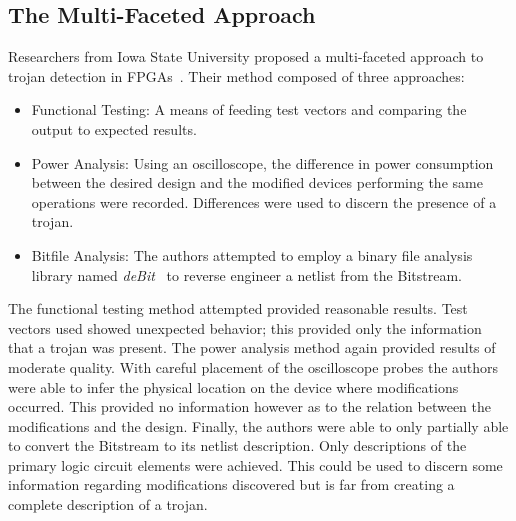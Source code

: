 \subsection{The Multi-Faceted Approach}
Researchers from Iowa State University proposed a multi-faceted approach to trojan detection in \acrshort{FPGA}s~\cite{multiFacetedApproach}.
Their method composed of three approaches:
\begin{itemize}
	\item Functional Testing: A means of feeding test vectors and comparing the output to expected results.
	\item Power Analysis: Using an oscilloscope, the difference in power consumption between the desired design and the modified devices performing the same operations were recorded. Differences were used to discern the presence of a trojan.
	\item Bitfile Analysis: The authors attempted to employ a binary file analysis library named \textit{deBit}~\cite{bitStreamToNetlist} to reverse engineer a netlist from the \gls{Bitstream}.
\end{itemize}
The functional testing method attempted provided reasonable results. 
Test vectors used showed unexpected behavior; this provided only the information that a trojan was present.
The power analysis method again provided results of moderate quality.
With careful placement of the oscilloscope probes the authors were able to infer the physical location on the device where modifications occurred.
This provided no information however as to the relation between the modifications and the design.
Finally, the authors were able to only partially able to convert the \gls{Bitstream} to its netlist description.
Only descriptions of the primary logic circuit elements were achieved.
This could be used to discern some information regarding modifications discovered but is far from creating a complete description of a trojan.


\setlength{\unitlength}{\savedunitlength}